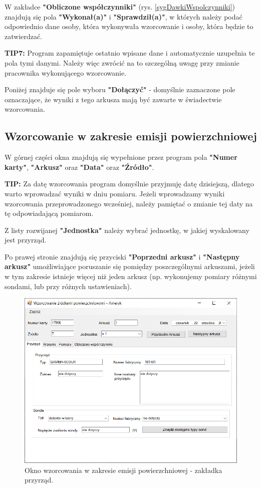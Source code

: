 {{{	W zakładce \textbf{"Obliczone współczynniki"} (rys. \ref{sygDawkiWspolczynniki}) znajdują się pola \textbf{"Wykonał(a)"} i \textbf{"Sprawdził(a)"}, w których należy podać odpowiednio dane osoby, która wykonywała wzorcowanie i osoby, która będzie to zatwierdzać. 
	
	\textbf{TIP7:} Program zapamiętuje ostatnio wpisane dane i automatycznie uzupełnia te pola tymi danymi. Należy więc zwrócić na to szczególną uwagę przy zmianie pracownika wykonującego wzorcowanie.
	
	Poniżej znajduje się pole wyboru \textbf{"Dołączyć"} - domyślnie zaznaczone pole oznaczające, że wyniki z tego arkusza mają być zawarte w świadectwie wzorcowania.

\subsection{Wzorcowanie w zakresie emisji powierzchniowej}
\label{wzorcowanie_emisja}

	W górnej części okna znajdują się wypełnione przez program pola \textbf{"Numer karty"}, \textbf{"Arkusz"} oraz \textbf{"Data"} oraz \textbf{"Źródło"}. 
	
	\textbf{TIP:} Za datę wzorcowania program domyślnie przyjmuję datę dzisiejszą, dlatego warto wprowadzać wyniki w dniu pomiaru. Jeżeli wprowadzamy wyniki wzorcowania przeprowadzonego wcześniej, należy pamiętać o zmianie tej daty na tę odpowiadającą pomiarom.
	
	Z listy rozwijanej \textbf{"Jednostka"} należy wybrać jednostkę, w jakiej wyskalowany jest przyrząd.
	
	Po prawej stronie znajdują się przyciski \textbf{"Poprzedni arkusz"} i \textbf{"Następny arkusz"} umożliwiające poruszanie się pomiędzy poszczególnymi arkuszami, jeżeli w tym zakresie istnieje więcej niż jeden arkusz (np. wykonujemy pomiary różnymi sondami, lub przy różnych ustawieniach).
	
	\begin{figure}[htb]
		\centering
		\includegraphics[width=\columnwidth]{obrazki/Wzorcowanie/emisja/przyrzad.png}
		\caption{Okno wzorcowania w zakresie emisji powierzchniowej - zakładka przyrząd.}
		\label{emisjaPrzyrzad}
	\end{figure}
	
}}}
